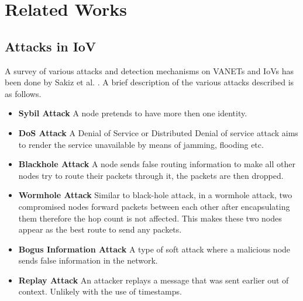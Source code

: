 \documentclass[journal]{IEEEtran}
\begin{document}

\section{Related Works}
\label{sec:RV}
\subsection{Attacks in IoV}
\label{sec:RV:attacks}
A survey of various attacks and detection mechanisms on VANETs and IoVs has been done by Sakiz et al. \cite{c:AttacksSurvey}. A brief description of the various attacks described is as follows.
\begin{itemize}
	\item \textbf{Sybil Attack} A node pretends to have more then one identity.
	\item \textbf{DoS Attack} A Denial of Service or Distributed Denial of service attack aims to render the service unavailable by means of jamming, flooding etc.
	\item \textbf{Blackhole Attack} A node sends false routing information to make all other nodes try to route their packets through it, the packets are then dropped.
	\item \textbf{Wormhole Attack} Similar to black-hole attack, in a wormhole attack, two compromised nodes forward packets between each other after encapsulating them therefore the hop count is not affected. This makes these two nodes appear as the best route to send any packets.
	\item \textbf{Bogus Information Attack} A type of soft attack where a malicious node sends false information in the network.
	\item \textbf{Replay Attack} An attacker replays a message that was sent earlier out of context. Unlikely with the use of timestamps.
\end{itemize}
\end{document}
